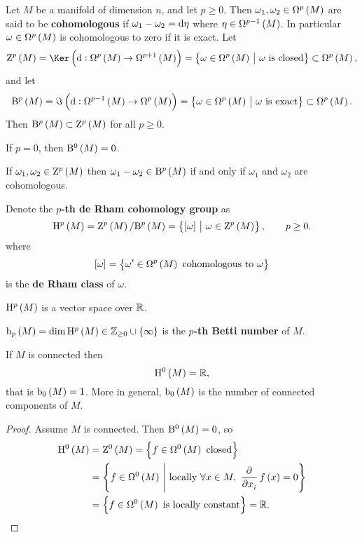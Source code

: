 
Let $ M $ be a manifold of dimension $ n $, and let $ p \ge 0 $. Then $ \omega_1, \omega_2 \in \Omega^p\br{M} $ are said to be \textbf{cohomologous} if $ \omega_1 - \omega_2 = \mathrm{d}\eta $ where $ \eta \in \Omega^{p - 1}\br{M} $. In particular $ \omega \in \Omega^p\br{M} $ is cohomologous to zero if it is exact. Let
$$ \Z^p\br{M} = \Ker \br{\d : \Omega^p\br{M} \to \Omega^{p + 1}\br{M}} = \cbr{\omega \in \Omega^p\br{M} \st \omega \ \text{is closed}} \subset \Omega^p\br{M}, $$
and let
$$ \B^p\br{M} = \Im \br{\d : \Omega^{p - 1}\br{M} \to \Omega^p\br{M}} = \cbr{\omega \in \Omega^p\br{M} \st \omega \ \text{is exact}} \subset \Omega^p\br{M}. $$
Then $ \B^p\br{M} \subset \Z^p\br{M} $ for all $ p \ge 0 $.

\begin{notation}
If $ p = 0 $, then $ \B^0\br{M} = 0 $.
\end{notation}

\begin{note*}
If $ \omega_1, \omega_2 \in \Z^p\br{M} $ then $ \omega_1 - \omega_2 \in \B^p\br{M} $ if and only if $ \omega_1 $ and $ \omega_2 $ are cohomologous.
\end{note*}

Denote the \textbf{$ p $-th de Rham cohomology group} as
$$ \H^p\br{M} = \Z^p\br{M} / \B^p\br{M} = \cbr{\sbr{\omega} \st \omega \in \Z^p\br{M}}, \qquad p \ge 0. $$
where
$$ \sbr{\omega} = \cbr{\omega' \in \Omega^p\br{M} \ \text{cohomologous to} \ \omega} $$
is the \textbf{de Rham class} of $ \omega $.

\begin{remark}
$ \H^p\br{M} $ is a vector space over $ \mathbb{R} $.
\end{remark}

\begin{definition}
$ \b_p\br{M} = \dim \H^p\br{M} \in \ZZ_{\ge 0} \cup \cbr{\infty} $ is the \textbf{$ p $-th Betti number} of $ M $.
\end{definition}

\begin{proposition}
If $ M $ is connected then
$$ \H^0\br{M} = \RR, $$
that is $ \b_0\br{M} = 1 $. More in general, $ \b_0\br{M} $ is the number of connected components of $ M $.
\end{proposition}

\begin{proof}
Assume $ M $ is connected. Then $ \B^0\br{M} = 0 $, so
\begin{align*}
\H^0\br{M}
& = \Z^0\br{M}
= \cbr{f \in \Omega^0\br{M} \ \text{closed}} \\
& = \cbr{f \in \Omega^0\br{M} \st \text{locally} \ \forall x \in M, \ \dpd{}{x_i}f\br{x} = 0} \\
& = \cbr{f \in \Omega^0\br{M} \ \text{is locally constant}}
= \RR.
\end{align*}
\end{proof}

